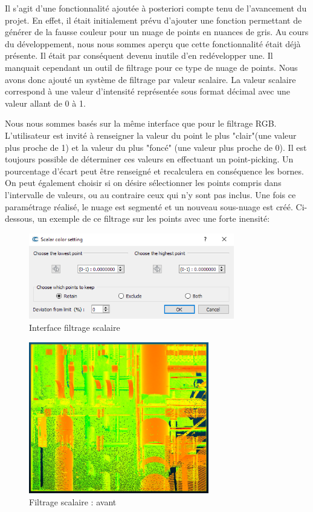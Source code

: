 \documentclass[12pt,titlepage,french]{article}
\begin{document}
Il s'agit d'une fonctionnalité ajoutée à posteriori compte tenu de l'avancement du projet. En effet, il était initialement prévu d'ajouter une fonction permettant de générer de la fausse couleur pour un nuage de points en nuances de gris. Au cours du développement, nous nous sommes aperçu que cette fonctionnalité était déjà présente. Il était par conséquent devenu inutile d'en redévelopper une. Il manquait cependant un outil de filtrage pour ce type de nuage de points. Nous avons donc ajouté un système de filtrage par valeur scalaire. La valeur scalaire correspond à une valeur d'intensité représentée sous format décimal avec une valeur allant de 0 à 1. \newline

Nous nous sommes basés sur la même interface que pour le filtrage RGB. L'utilisateur est invité à renseigner la valeur du point le plus "clair"(une valeur plus proche de 1) et la valeur du plus "foncé" (une valeur plus proche de 0). Il est toujours possible de déterminer ces valeurs en effectuant un point-picking. Un pourcentage d'écart peut être renseigné et recalculera en conséquence les bornes. On peut également choisir si on désire sélectionner les points compris dans l'intervalle de valeurs, ou au contraire ceux qui n'y sont pas inclus. Une fois ce paramétrage réalisé, le nuage est segmenté et un nouveau sous-nuage est créé. Ci-dessous, un exemple de ce filtrage sur les points avec une forte inensité:

\begin{figure}[H]
\center \includegraphics[width=0.8\textwidth]{./img/scalar_menu.png}
  \caption{\label{} Interface filtrage scalaire}
\end{figure}

\begin{figure}[H]
\center
\includegraphics[width=0.7\textwidth]{./img/scalar_avant.png}
\caption{\label{} Filtrage scalaire : avant}
\end{figure}
\end{document}
